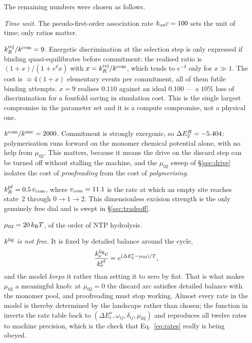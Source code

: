 \noindent
The remaining numbers were chosen as follows.

\emph{Time unit.}  The pseudo-first-order association rate $k_{\rm on}c=100$ sets
the unit of time; only ratios matter.

\emph{$k^{\rm rej}_R/k^{\rm com}=9$.}  Energetic discrimination at the selection step is
only expressed if binding quasi-equilibrates before commitment: the realised ratio is
$(1+x)/(1+e^{\delta}x)$ with $x=k^{\rm rej}_R/k^{\rm com}$, which tends to $e^{-\delta}$
only for $x\gg1$.  The cost is $\approx4(1+x)$ elementary events per commitment, all of
them futile binding attempts.  $x=9$ realises $0.110$ against an ideal $0.100$ --- a
$10\%$ loss of discrimination for a fourfold saving in simulation cost.  This is the
single largest compromise in the parameter set and it is a compute compromise, not a
physical one.

\emph{$k^{\rm com}/k^{\rm unc}=2000$.}  Commitment is strongly exergonic, so
$\Delta E_2^{R}=-5.404$: polymerisation runs forward on the monomer chemical
potential alone, with no help from $\mu_{02}$.  This matters, because it means the
drive on the discard step can be turned off without stalling the machine, and the
$\mu_{02}$ sweep of \S\ref{sec:drive} isolates the cost of \emph{proofreading} from the
cost of \emph{polymerising}.

\emph{$k^{\rm pf}_R=0.5\,v_{\rm com}$}, where $v_{\rm com}=11.1$ is the rate
at which an empty site reaches state~2 through $0\!\to\!1\!\to\!2$.  This dimensionless
excision strength is the only genuinely free dial and is swept in \S\ref{sec:tradeoff}.

\emph{$\mu_{02}=20\,k_\mathrm{B} T$}, of the order of NTP hydrolysis.

\emph{$k^{\rm lig}$ is not free.}  It is fixed by detailed balance around the cycle,
\begin{equation}
  \frac{k^{\rm lig}_\nu c}{k^{\rm pf}_\nu}=e^{(\Delta E_2^{\nu}-\mu_{02})/T},
  \label{eq:db}
\end{equation}
and the model \emph{keeps} it rather than setting it to zero by fiat.  That is what
makes $\mu_{02}$ a meaningful knob: at $\mu_{02}=0$ the discard arc satisfies detailed
balance with the monomer pool, and proofreading must stop working.  Almost every rate
in the model is thereby determined by the landscape rather than chosen; the function
 in  inverts the rate table back to
$(\Delta E_i^{\nu},\omega_{ij},\delta_{ij},\mu_{02})$ and reproduces all twelve rates to
machine precision, which is the check that Eq.~\eqref{eq:rates} really is being obeyed.

